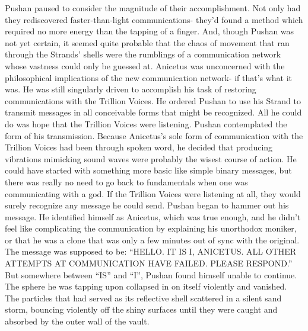 \documentclass[a4paper]{article}
\begin{document}
Pushan paused to consider the magnitude of their accomplishment. Not only had they rediscovered faster-than-light communications- they’d found a method which required no more energy than the tapping of a finger. And, though Pushan was not yet certain, it seemed quite probable that the chaos of movement that ran through the Strands’ shells were the rumblings of a communication network whose vastness could only be guessed at.
Anicetus was unconcerned with the philosophical implications of the new communication network- if that’s what it was. He was still singularly driven to accomplish his task of restoring communications with the Trillion Voices. He ordered Pushan to use his Strand to transmit messages in all conceivable forms that might be recognized. All he could do was hope that the Trillion Voices were listening.
Pushan contemplated the form of his transmission. Because Anicetus’s sole form of communication with the Trillion Voices had been through spoken word, he decided that producing vibrations mimicking sound waves were probably the wisest course of action. He could have started with something more basic like simple binary messages, but there was really no need to go back to fundamentals when one was communicating with a god. If the Trillion Voices were listening at all, they would surely recognize any message he could send.
Pushan began to hammer out his message. He identified himself as Anicetus, which was true enough, and he didn’t feel like complicating the communication by explaining his unorthodox moniker, or that he was a clone that was only a few minutes out of sync with the original.
The message was supposed to be: “HELLO. IT IS I, ANICETUS. ALL OTHER ATTEMPTS AT COMMUNICATION HAVE FAILED. PLEASE RESPOND.”
But somewhere between “IS” and “I”, Pushan found himself unable to continue. The sphere he was tapping upon collapsed in on itself violently and vanished. The particles that had served as its reflective shell scattered in a silent sand storm, bouncing violently off the shiny surfaces until they were caught and absorbed by the outer wall of the vault.
\end{document}
